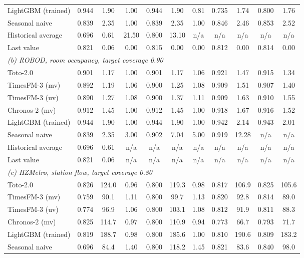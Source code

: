 \documentclass[utf8]{FrontiersinHarvard}
\theoremstyle{plain}
\theoremstyle{definition}
\theoremstyle{remark}
\begin{document}
{\begin{table}[htbp]
\begin{tabular}{lcc@{\hspace{9pt}}ccc@{\hspace{9pt}}ccc@{\hspace{9pt}}cc}
LightGBM (trained)  & 0.944 & 1.90 & 1.00 & 0.944 & 1.90 & 0.81 & 0.735 & 1.74 & 0.800 & 1.76 \\
Seasonal naive      & 0.839 & 2.35 & 1.00 & 0.839 & 2.35 & 1.00 & 0.846 & 2.46 & 0.853 & 2.52 \\
Historical average  & 0.696 & 0.61 & 21.50 & 0.800 & 13.10 & n/a & n/a & n/a & n/a & n/a \\
Last value          & 0.821 & 0.06 & 0.00 & 0.815 & 0.00 & 0.00 & 0.812 & 0.00 & 0.814 & 0.00 \\
\midrule
\multicolumn{11}{l}{\emph{(b) ROBOD, room occupancy, target coverage \num{0.90}}}\\
Toto-2.0            & 0.901 & 1.17 & 1.00 & 0.901 & 1.17 & 1.06 & 0.921 & 1.47 & 0.915 & 1.34 \\
TimesFM-3 (mv)      & 0.892 & 1.19 & 1.06 & 0.900 & 1.25 & 1.08 & 0.909 & 1.51 & 0.907 & 1.40 \\
TimesFM-3 (uv)      & 0.890 & 1.27 & 1.08 & 0.900 & 1.37 & 1.11 & 0.909 & 1.63 & 0.910 & 1.55 \\
Chronos-2 (mv)      & 0.912 & 1.45 & 1.00 & 0.912 & 1.45 & 1.00 & 0.918 & 1.67 & 0.916 & 1.52 \\
LightGBM (trained)  & 0.944 & 1.90 & 1.00 & 0.944 & 1.90 & 1.00 & 0.942 & 2.14 & 0.943 & 2.01 \\
Seasonal naive      & 0.839 & 2.35 & 3.00 & 0.902 & 7.04 & 5.00 & 0.919 & 12.28 & n/a & n/a \\
Historical average  & 0.696 & 0.61 & n/a & n/a & n/a & n/a & n/a & n/a & n/a & n/a \\
Last value          & 0.821 & 0.06 & n/a & n/a & n/a & n/a & n/a & n/a & n/a & n/a \\
\midrule
\multicolumn{11}{l}{\emph{(c) HZMetro, station flow, target coverage \num{0.80}}}\\
Toto-2.0            & 0.826 & 124.0 & 0.96 & 0.800 & 119.3 & 0.98 & 0.817 & 106.9 & 0.825 & 105.6 \\
TimesFM-3 (mv)      & 0.759 & 90.1 & 1.11 & 0.800 & 99.7 & 1.13 & 0.820 & 92.8 & 0.814 & 89.0 \\
TimesFM-3 (uv)      & 0.774 & 96.9 & 1.06 & 0.800 & 103.1 & 1.08 & 0.812 & 91.9 & 0.811 & 88.3 \\
Chronos-2 (mv)      & 0.825 & 114.7 & 0.97 & 0.800 & 110.9 & 0.94 & 0.773 & 66.7 & 0.793 & 71.7 \\
LightGBM (trained)  & 0.819 & 188.7 & 0.98 & 0.800 & 185.6 & 1.00 & 0.810 & 190.6 & 0.809 & 183.2 \\
Seasonal naive      & 0.696 & 84.4 & 1.40 & 0.800 & 118.2 & 1.45 & 0.821 & 83.6 & 0.840 & 98.0 \\

\end{tabular}
\end{table}}
\end{document}
